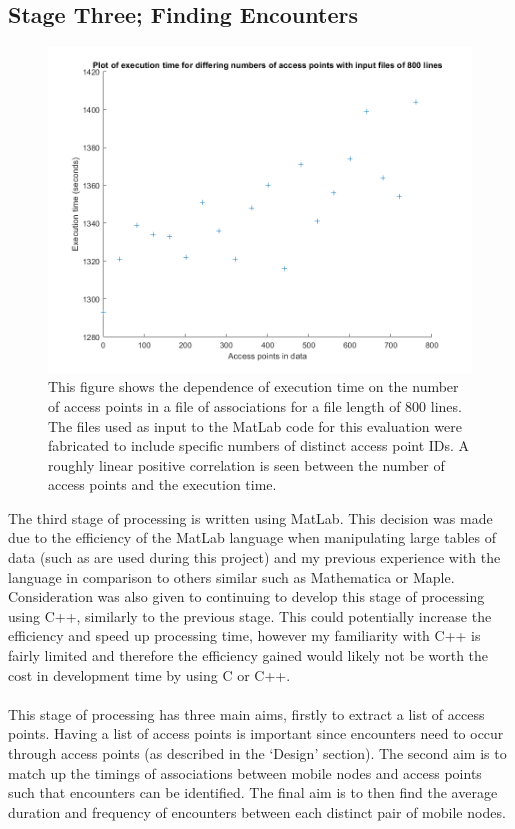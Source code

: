 \subsection{Stage Three; Finding Encounters} 

\begin{figure}[h]
    \centering
    \includegraphics[width=\textwidth]{ap_vs_time.png}
    \caption{This figure shows the dependence of execution time on the number of access points in a file of associations for a file length of 800 lines. The files used as input to the MatLab code for this evaluation were fabricated to include specific numbers of distinct access point IDs. A roughly linear positive correlation is seen between the number of access points and the execution time.}
    \label{fig:AP_vs_time}
\end{figure}

The third stage of processing is written using MatLab. This decision was made due to the efficiency of the MatLab language when manipulating large tables of data (such as are used during this project) and my previous experience with the language in comparison to others similar such as Mathematica or Maple. Consideration was also given to continuing to develop this stage of processing using C++, similarly to the previous stage. This could potentially increase the efficiency and speed up processing time, however my familiarity with C++ is fairly limited and therefore the efficiency gained would likely not be worth the cost in development time by using C or C++.\\\\
This stage of processing has three main aims, firstly to extract a list of access points. Having a list of access points is important since encounters need to occur through access points (as described in the `Design' section). The second aim is to match up the timings of associations between mobile nodes and access points such that encounters can be identified. The final aim is to then find the average duration and frequency of encounters between each distinct pair of mobile nodes. 

